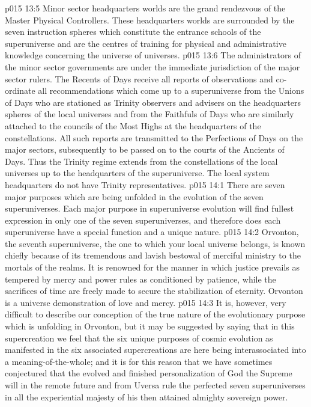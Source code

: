 \vs p015 13:5 Minor sector headquarters worlds are the grand rendezvous of the Master Physical Controllers. These headquarters worlds are surrounded by the seven instruction spheres which constitute the entrance schools of the superuniverse and are the centres of training for physical and administrative knowledge concerning the universe of universes.
\vs p015 13:6 The administrators of the minor sector governments are under the immediate jurisdiction of the major sector rulers. The Recents of Days receive all reports of observations and co\hyp{}ordinate all recommendations which come up to a superuniverse from the Unions of Days who are stationed as Trinity observers and advisers on the headquarters spheres of the local universes and from the Faithfuls of Days who are similarly attached to the councils of the Most Highs at the headquarters of the constellations. All such reports are transmitted to the Perfections of Days on the major sectors, subsequently to be passed on to the courts of the Ancients of Days. Thus the Trinity regime extends from the constellations of the local universes up to the headquarters of the superuniverse. The local system headquarters do not have Trinity representatives.
\vs p015 14:1 There are seven major purposes which are being unfolded in the evolution of the seven superuniverses. Each major purpose in superuniverse evolution will find fullest expression in only one of the seven superuniverses, and therefore does each superuniverse have a special function and a unique nature.
\vs p015 14:2 Orvonton, the seventh superuniverse, the one to which your local universe belongs, is known chiefly because of its tremendous and lavish bestowal of merciful ministry to the mortals of the realms. It is renowned for the manner in which justice prevails as tempered by mercy and power rules as conditioned by patience, while the sacrifices of time are freely made to secure the stabilization of eternity. Orvonton is a universe demonstration of love and mercy.
\vs p015 14:3 It is, however, very difficult to describe our conception of the true nature of the evolutionary purpose which is unfolding in Orvonton, but it may be suggested by saying that in this supercreation we feel that the six unique purposes of cosmic evolution as manifested in the six associated supercreations are here being interassociated into a meaning\hyp{}of\hyp{}the\hyp{}whole; and it is for this reason that we have sometimes conjectured that the evolved and finished personalization of God the Supreme will in the remote future and from Uversa rule the perfected seven superuniverses in all the experiential majesty of his then attained almighty sovereign power.
